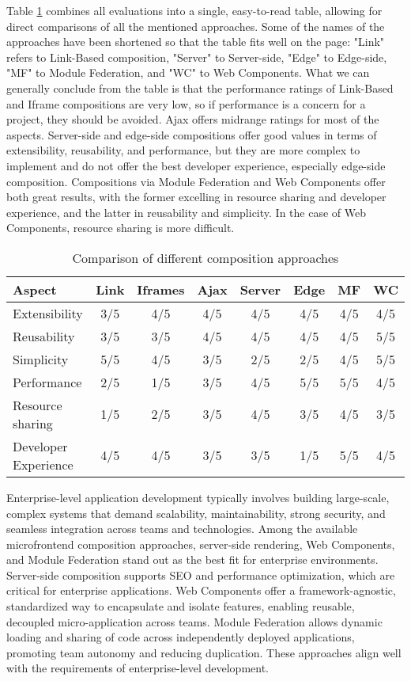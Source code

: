 Table \ref{table:composition-comparison} combines all evaluations into a single, easy-to-read table, allowing for direct comparisons of all the mentioned approaches. Some of the names of the approaches have been shortened so that the table fits well on the page: "Link" refers to Link-Based composition, "Server" to Server-side, "Edge" to Edge-side, "MF" to Module Federation, and "WC" to Web Components. What we can generally conclude from the table is that the performance ratings of Link-Based and Iframe compositions are very low, so if performance is a concern for a project, they should be avoided. Ajax offers midrange ratings for most of the aspects. Server-side and edge-side compositions offer good values in terms of extensibility, reusability, and performance, but they are more complex to implement and do not offer the best developer experience, especially edge-side composition. Compositions via Module Federation and Web Components offer both great results, with the former excelling in resource sharing and developer experience, and the latter in reusability and simplicity. In the case of Web Components, resource sharing is more difficult.\\
\begin{table}[h]
  \centering
  \begin{tabular}{|p{3cm}|c|c|c|c|c|c|c|}
    \hline
      \textbf{Aspect} & \textbf{Link} & \textbf{Iframes} & \textbf{Ajax} & \textbf{Server} & \textbf{Edge} & \textbf{MF} & \textbf{WC} \\
    \hline
      Extensibility & 3/5 & 4/5 & 4/5 & 4/5 & 4/5 & 4/5 & 4/5 \\
    \hline
      Reusability & 3/5 & 3/5 & 4/5 & 4/5 & 4/5 & 4/5 & 5/5 \\
    \hline
      Simplicity & 5/5 & 4/5 & 3/5 & 2/5 & 2/5 & 4/5 & 5/5 \\
    \hline
      Performance & 2/5 & 1/5 & 3/5 & 4/5 & 5/5 & 5/5 & 4/5 \\
    \hline
      Resource sharing & 1/5 & 2/5 & 3/5 & 4/5 & 3/5 & 4/5 & 3/5 \\
    \hline
      Developer Experience & 4/5 & 4/5 & 3/5 & 3/5 & 1/5 & 5/5 & 4/5 \\
    \hline
  \end{tabular}
  \caption{Comparison of different composition approaches}
  \label{table:composition-comparison}
\end{table}
Enterprise-level application development typically involves building large-scale, complex systems that demand scalability, maintainability, strong security, and seamless integration across teams and technologies. Among the available microfrontend composition approaches, server-side rendering, Web Components, and Module Federation stand out as the best fit for enterprise environments. Server-side composition supports SEO and performance optimization, which are critical for enterprise applications. Web Components offer a framework-agnostic, standardized way to encapsulate and isolate features, enabling reusable, decoupled micro-application across teams. Module Federation allows dynamic loading and sharing of code across independently deployed applications, promoting team autonomy and reducing duplication. These approaches align well with the requirements of enterprise-level development.


